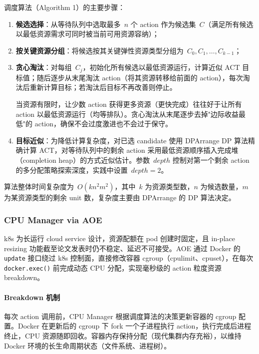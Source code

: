 \documentclass[11pt, a4paper]{article}
\begin{document}
调度算法（Algorithm 1）的主要步骤：

\begin{enumerate}
  \item \textbf{候选选择}：从等待队列中选取最多~$n$ 个 action 作为候选集~$C$（满足所有候选以最低资源需求可同时被当前可用资源容纳）；
  \item \textbf{按关键资源分组}：将候选按其关键弹性资源类型分组为~$C_0, C_1, \ldots, C_{k-1}$；
  \item \textbf{贪心淘汰}：对每组~$C_j$，初始化所有候选以最低资源运行，计算近似 ACT 目标值；随后逐步从末尾淘汰 action（将其资源转移给前面的 action），每次淘汰后重新计算目标；若淘汰后目标不再改善则停止。

\begin{keyinsight}[贪心淘汰的直觉]
当资源有限时，让少数 action 获得更多资源（更快完成）往往好于让所有 action 以最低资源运行（均等排队）。贪心淘汰从末尾逐步去掉"边际收益最低"的 action，确保不会过度激进也不会过于保守。
\end{keyinsight}

  \item \textbf{目标近似}：为降低计算复杂度，对已选 candidate 使用 DPArrange DP 算法精确计算 ACT，对等待队列中的剩余 action 采用最低资源顺序插入完成堆（completion heap）的方式近似估计。参数~$\mathit{depth}$ 控制对第一个剩余 action 的多分配策略探索深度，实践中设置~$\mathit{depth} = 2$。
\end{enumerate}

算法整体时间复杂度为~$O(kn^2m^2)$，其中~$k$ 为资源类型数，$n$ 为候选数量，$m$ 为某资源类型的剩余 unit 数，复杂度主要由 DPArrange 的 DP 算法决定。

\subsubsection{CPU Manager via AOE}

\begin{keyinsight}
k8s 为长运行 cloud service 设计，资源配额在 pod 创建时固定，且 in-place resizing 功能截至论文发表时仍不稳定、延迟不可接受。AOE 通过 Docker 的 \texttt{update} 接口绕过 k8s 控制面，直接修改容器 cgroup（cpulimit、cpuset），在每次 \texttt{docker.exec()} 前完成动态 CPU 分配，实现毫秒级的 action 粒度资源 breakdown。
\end{keyinsight}

\paragraph{Breakdown 机制}
每次 action 调用前，CPU Manager 根据调度算法的决策更新容器的 cgroup 配置。Docker 在更新后的 cgroup 下 fork 一个子进程执行 action，执行完成后进程终止，CPU 资源随即回收。容器内存保持分配（现代集群内存充裕），以维持 Docker 环境的长生命周期状态（文件系统、进程树）。
\end{document}
